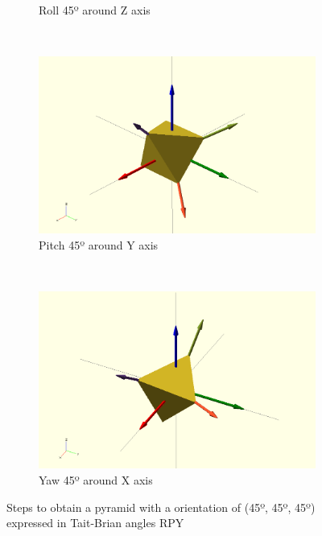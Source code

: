 \begin{figure}[h]
\begin{subfigure}[b]{0.4\textwidth}
                \caption{Roll 45º around Z axis }
                \label{fig:soft_orientation_roll}
        \end{subfigure}
        ~
        \begin{subfigure}[b]{0.4\textwidth}
         	   \centering
                \includegraphics[width=\textwidth]{images/Orientation/tait-bryan-03.png}
                \caption{Pitch 45º around Y axis}
                \label{fig:soft_orientation_pitch}
        \end{subfigure}        
        ~
        \begin{subfigure}[b]{0.4\textwidth}
         	   \centering
                \includegraphics[width=\textwidth]{images/Orientation/tait-bryan-04.png}
                \caption{Yaw 45º around X axis}
                \label{fig:soft_orientation_yaw}
        \end{subfigure}
        \caption{Steps to obtain a pyramid with a orientation of (45º, 45º, 45º) expressed in Tait-Brian angles RPY}\label{fig:soft_orientation_example}
\end{figure}


